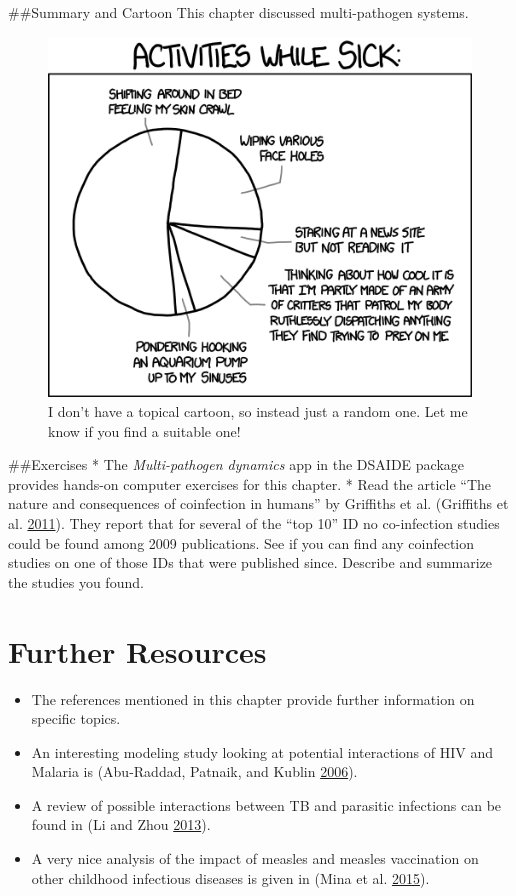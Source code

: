 \documentclass[]{book}
\providecommand{\tightlist}{%
  \setlength{\itemsep}{0pt}\setlength{\parskip}{0pt}}
\theoremstyle{definition}
\theoremstyle{definition}
\theoremstyle{definition}
\theoremstyle{remark}
\begin{document}
\#\#Summary and Cartoon This chapter discussed multi-pathogen systems.

\begin{figure}
\centering
\includegraphics{./images/xkcd-sick_day.png}
\caption{I don't have a topical cartoon, so instead just a random one.
Let me know if you find a suitable one!}
\end{figure}

\#\#Exercises * The \emph{Multi-pathogen dynamics} app in the DSAIDE
package provides hands-on computer exercises for this chapter. * Read
the article ``The nature and consequences of coinfection in humans'' by
Griffiths et al. (Griffiths et al.
\protect\hyperlink{ref-griffiths11}{2011}). They report that for several
of the ``top 10'' ID no co-infection studies could be found among 2009
publications. See if you can find any coinfection studies on one of
those IDs that were published since. Describe and summarize the studies
you found.

\hypertarget{further-resources-5}{%
\section{Further Resources}\label{further-resources-5}}

\begin{itemize}
\tightlist
\item
  The references mentioned in this chapter provide further information
  on specific topics.
\item
  An interesting modeling study looking at potential interactions of HIV
  and Malaria is (Abu-Raddad, Patnaik, and Kublin
  \protect\hyperlink{ref-abu-raddad06}{2006}).
\item
  A review of possible interactions between TB and parasitic infections
  can be found in (Li and Zhou \protect\hyperlink{ref-li13}{2013}).
\item
  A very nice analysis of the impact of measles and measles vaccination
  on other childhood infectious diseases is given in (Mina et al.
  \protect\hyperlink{ref-mina15}{2015}).
\end{itemize}
\end{document}
